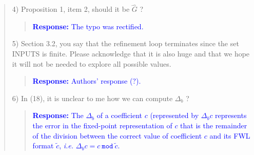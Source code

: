 \documentclass[11pt]{article}
\begin{document}
\begin{quote}
4) Proposition 1, item 2, should it be $\hat G$ ?
\begin{quote}
\textcolor{blue}{\textbf{Response:} The typo was rectified.}
\end{quote}

5) Section 3.2, you say that the refinement loop terminates since the set INPUTS is finite. Please acknowledge that it is also huge and that we hope it will not be needed to explore all possible values.
\begin{quote}
\textcolor{blue}{\textbf{Response:} Authors' response (?).}
\end{quote}


6) In (18), it is unclear to me how we can compute  $\Delta_b$ ?
\begin{quote}
\textcolor{blue}{\textbf{Response:} The $\Delta_{b}$ of a coefficient $c$ (represented by $\Delta_{b}c$ represents the error in the fixed-point representation of $c$ that is the remainder of the division between the correct value of coefficient $c$ and its FWL format $\tilde{c}$, {\it i.e.} $\Delta_{b}c=c~ \texttt{mod}~\tilde{c}$.}
\end{quote}


\end{quote}


\newpage
\end{document}
